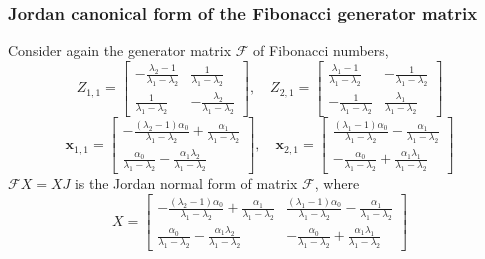 \documentclass[9pt]{beamer}
\begin{document}
\begin{frame}[fragile]
\frametitle{Jordan canonical form of the Fibonacci generator matrix}
Consider again the generator matrix $\mathcal{F}$ of Fibonacci numbers,
\begin{displaymath}
Z_{1,1} = \left[\begin{matrix}- \frac{\lambda_{2} - 1}{\lambda_{1} - \lambda_{2}} & \frac{1}{\lambda_{1} - \lambda_{2}}\\\frac{1}{\lambda_{1} - \lambda_{2}} & - \frac{\lambda_{2}}{\lambda_{1} - \lambda_{2}}\end{matrix}\right], \quad Z_{2,1} = \left[\begin{matrix}\frac{\lambda_{1} - 1}{\lambda_{1} - \lambda_{2}} & - \frac{1}{\lambda_{1} - \lambda_{2}}\\- \frac{1}{\lambda_{1} - \lambda_{2}} & \frac{\lambda_{1}}{\lambda_{1} - \lambda_{2}}\end{matrix}\right]
\end{displaymath}
\begin{displaymath}
\boldsymbol{x}_{1,1} = \left[\begin{matrix}- \frac{\left(\lambda_{2} - 1\right) \alpha_{0}}{\lambda_{1} - \lambda_{2}} + \frac{\alpha_{1}}{\lambda_{1} - \lambda_{2}}\\\frac{\alpha_{0}}{\lambda_{1} - \lambda_{2}} - \frac{\alpha_{1} \lambda_{2}}{\lambda_{1} - \lambda_{2}}\end{matrix}\right], \quad \boldsymbol{x}_{2,1} = \left[\begin{matrix}\frac{\left(\lambda_{1} - 1\right) \alpha_{0}}{\lambda_{1} - \lambda_{2}} - \frac{\alpha_{1}}{\lambda_{1} - \lambda_{2}}\\- \frac{\alpha_{0}}{\lambda_{1} - \lambda_{2}} + \frac{\alpha_{1} \lambda_{1}}{\lambda_{1} - \lambda_{2}}\end{matrix}\right]
\end{displaymath}
$\mathcal{F}X=XJ$ is the Jordan normal form of matrix $\mathcal{F}$, where
\begin{displaymath}
X = \left[\begin{matrix}- \frac{\left(\lambda_{2} - 1\right) \alpha_{0}}{\lambda_{1} - \lambda_{2}} + \frac{\alpha_{1}}{\lambda_{1} - \lambda_{2}} & \frac{\left(\lambda_{1} - 1\right) \alpha_{0}}{\lambda_{1} - \lambda_{2}} - \frac{\alpha_{1}}{\lambda_{1} - \lambda_{2}}\\\frac{\alpha_{0}}{\lambda_{1} - \lambda_{2}} - \frac{\alpha_{1} \lambda_{2}}{\lambda_{1} - \lambda_{2}} & - \frac{\alpha_{0}}{\lambda_{1} - \lambda_{2}} + \frac{\alpha_{1} \lambda_{1}}{\lambda_{1} - \lambda_{2}}\end{matrix}\right]

\end{displaymath}
\end{frame}
\end{document}
